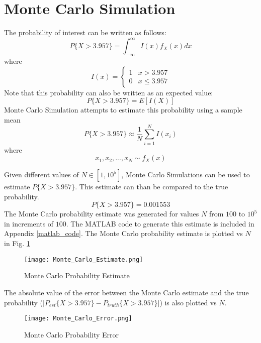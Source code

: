 \documentclass[conference]{IEEEtran}
\begin{document}
\section{Monte Carlo Simulation}
The probability of interest can be written as follows:
\begin{equation}
P\{X > 3.957\} = \int_{-\infty}^{\infty}I(x)f_X(x)dx
\end{equation}
where
\begin{equation}
I(x) = \begin{cases}
1 & x > 3.957 \\
0 & x \leq 3.957
\end{cases}
\end{equation}
Note that this probability can also be written as an expected value:
\begin{equation}
P\{X > 3.957\} = E[I(X)]
\end{equation}
Monte Carlo Simulation attempts to estimate this probability using a sample mean
\begin{equation}
P\{X > 3.957\} \approx \frac{1}{N}\sum_{i=1}^{N}I(x_i)
\end{equation}
where
\begin{equation}
x_1, x_2, ..., x_N \sim f_X(x)
\end{equation}
\par
Given different values of $N \in [1, 10^5]$, Monte Carlo Simulations can be used to estimate $P\{X > 3.957\}$. This estimate can than be compared to the true probability.
\begin{equation}
P\{X > 3.957\} = 0.001553
\end{equation}
The Monte Carlo probability estimate was generated for values $N$ from $100$ to $10^5$ in increments of $100$. The MATLAB code to generate this estimate is included in Appendix \ref{matlab_code}. The Monte Carlo probability estimate is plotted vs $N$ in Fig. \ref{Monte Carlo Estimate}
\begin{figure}[H]
\centerline{\texttt{[image: Monte\_Carlo\_Estimate.png]}}
\caption{Monte Carlo Probability Estimate}
\label{Monte Carlo Estimate}
\end{figure}
The absolute value of the error between the Monte Carlo estimate and the true probability ($|P_{est}\{X > 3.957\} - P_{truth}\{X > 3.957\}|$) is also plotted vs $N$.
\begin{figure}[H]
\centerline{\texttt{[image: Monte\_Carlo\_Error.png]}}
\caption{Monte Carlo Probability Error}
\label{Monte Carlo Perr}
\end{figure}
\end{document}
